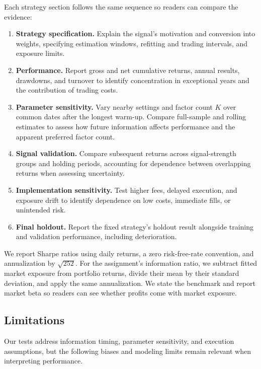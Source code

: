 Each strategy section follows the same sequence so readers can compare
the evidence:
\begin{enumerate}
    \item \textbf{Strategy specification.} Explain the signal's motivation
    and conversion into weights, specifying estimation windows, refitting
    and trading intervals, and exposure limits.
    \item \textbf{Performance.} Report gross and net cumulative returns,
    annual results, drawdowns, and turnover to identify concentration in
    exceptional years and the contribution of trading costs.
    \item \textbf{Parameter sensitivity.} Vary nearby settings and factor
    count \(K\) over common dates after the longest warm-up. Compare
    full-sample and rolling estimates to assess how future information
    affects performance and the apparent preferred factor count.
    \item \textbf{Signal validation.} Compare subsequent returns across
    signal-strength groups and holding periods, accounting for dependence
    between overlapping returns when assessing uncertainty.
    \item \textbf{Implementation sensitivity.} Test higher fees, delayed
    execution, and exposure drift to identify dependence on low costs,
    immediate fills, or unintended risk.
    \item \textbf{Final holdout.} Report the fixed strategy's holdout result
    alongside training and validation performance, including deterioration.
\end{enumerate}

We report Sharpe ratios using daily returns, a zero risk-free-rate
convention, and annualization by \(\sqrt{252}\). For the assignment's
information ratio, we subtract fitted market exposure from portfolio
returns, divide their mean by their standard deviation, and apply the
same annualization. We state the benchmark and report market beta so
readers can see whether profits come with market exposure.

\subsection{Limitations}

Our tests address information timing, parameter sensitivity, and execution
assumptions, but the following biases and modeling limits remain relevant
when interpreting performance.


